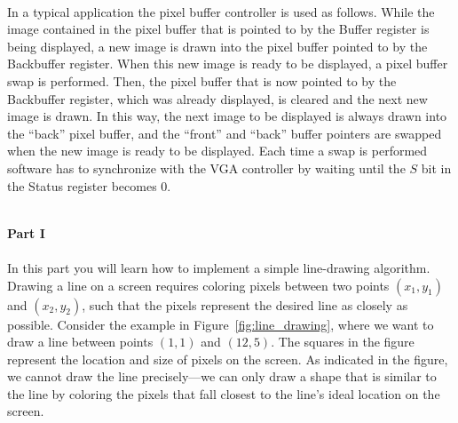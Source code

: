 \documentclass[epsfig,10pt,fullpage]{article}
\begin{document}
~\\
\noindent
In a typical application the pixel buffer controller is used as follows. While the image
contained in the pixel buffer that is pointed to by the Buffer register is being displayed, 
a new image is drawn into the pixel buffer pointed to by the Backbuffer register. When this new
image is ready to be displayed, a pixel buffer swap is performed. Then, the pixel buffer 
that is now pointed to by the Backbuffer register, which was already displayed, is cleared and 
the next new image is drawn. In this way, the next image to be displayed is always drawn into
the ``back'' pixel buffer, and the ``front'' and ``back'' buffer pointers are swapped when 
the new image is ready to be displayed. Each time a swap is performed software has to 
synchronize with the VGA controller by waiting until the $S$ bit in the Status register becomes 0.

~\\
\noindent
{\bf Part I}
~\\
~\\
\noindent
In this part you will learn how to implement a simple line-drawing algorithm.
Drawing a line on a screen requires coloring pixels between two points $(x_1,y_1)$ and 
$(x_2,y_2)$, such that the pixels represent the desired line as closely as possible. Consider 
the example in Figure~\ref{fig:line_drawing}, where we want to draw a line between 
points $(1,1)$ and $(12,5)$. The squares in the figure represent the location and size of pixels
on the screen. As indicated in the figure, we cannot draw the line precisely---we can
only draw a shape that is similar to the line by coloring the pixels that fall closest to 
the line's ideal location on the screen.
\end{document}
